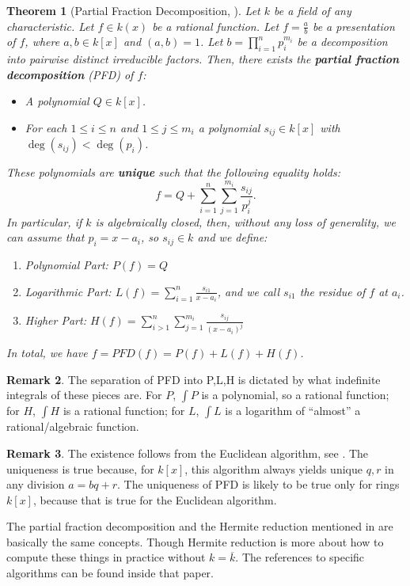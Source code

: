 \documentclass{amsart}
\newcommand{\op}{\operatorname}
\newtheorem{thm}{Theorem}[section]
\theoremstyle{definition}
\newtheorem{remark}[thm]{Remark}
\begin{document}
\begin{thm}[Partial Fraction Decomposition, {\cite[Theorem 2]{PFD_euclidean_1989}}]\label{thm: PFD}
    Let $k$ be a field of any characteristic.
    Let $f\in k(x)$ be a rational function. Let $f=\frac{a}{b}$ be a presentation of $f$, where $a,b\in k[x]$ and $(a,b)=1$. Let $b=\prod_{i=1}^n p_i^{m_i}$ be a decomposition into pairwise distinct irreducible factors. Then, there exists the \textbf{partial fraction decomposition} (PFD) of $f$:
    \begin{itemize}
        \item A polynomial $Q\in k[x]$.
        \item For each $1\le i\le n$ and $1\le j\le m_i$ a polynomial $s_{ij}\in k[x]$ with $\op{deg}(s_{ij})<\op{deg}(p_i)$.
    \end{itemize}
    These polynomials are\textbf{ unique} such that the following equality holds:
    \[
    f=Q+\sum_{i=1}^n\sum_{j=1}^{m_i} \frac{s_{ij}}{p_i^j}.
    \]
    In particular, if $k$ is algebraically closed, then, without any loss of generality, we can assume that $p_i=x-a_i$, so $s_{ij}\in k$ and we define:
    \begin{enumerate}
        \item Polynomial Part: $P(f)=Q$
        \item Logarithmic Part: $L(f)=\sum_{i=1}^n\frac{s_{i1}}{x-a_i}$, and we call $s_{i1}$ the residue of $f$ at $a_i$.
        \item Higher Part: $H(f)=\sum_{i>1}^n\sum_{j=1}^{m_i} \frac{s_{ij}}{{(x-a_i)}^j}$
    \end{enumerate}
    In total, we have $f=PFD(f)=P(f)+L(f)+H(f)$.
\end{thm}

\begin{remark}
    The separation of PFD into P,L,H is dictated by what indefinite integrals of these pieces are. For $P$, $\int P$ is a polynomial, so a rational function; for $H$, $\int H$ is a rational function; for $L$, $\int L$ is a logarithm of ``almost'' a rational/algebraic function.
\end{remark}

\begin{remark}
    The existence follows from the Euclidean algorithm, see \cite{PFD_euclidean_1989}. The uniqueness is true because, for $k[x]$, this algorithm always yields unique $q,r$ in any division $a=bq+r$. The uniqueness of PFD is likely to be true only for rings $k[x]$, because that is true for the Euclidean algorithm.

    The partial fraction decomposition and the Hermite reduction mentioned in \cite{rational_first_for_separated_2025} are basically the same concepts. Though Hermite reduction is more about how to compute these things in practice without $k=\overline{k}$. The references to specific algorithms can be found inside that paper.
\end{remark}
\end{document}
